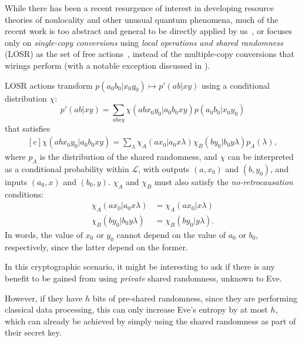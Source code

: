 \documentclass[10pt, a4paper]{article}
\numberwithin{equation}{section} %
\theoremstyle{definition}
\theoremstyle{plain}
\newcommand{\?}{\mathrel{?}} %
\newcommand{\Ls}{\mathcal{L}}
\begin{document}
      While there has been a recent resurgence of interest in developing resource theories of nonlocality and other unusual quantum phenomena, much of the recent work is too abstract and general to be directly applied by us~\cite{Monotones, TypeIndepLOSR}, or focuses only on \emph{single-copy conversions} using \emph{local operations and shared randomness} (LOSR) as the set of free actions~\cite{BellResourceTheory, TraceDistNL, NLMeas}, instead of the multiple-copy conversions that wirings perform (with a notable exception discussed in ).

      LOSR actions transform \(p(a_0 b_0|x_0 y_0) \mapsto p'(ab|xy)\) using a conditional distribution \(\chi\):
      \begin{equation}
        p'(ab|xy) = \sum_{abxy} \chi(abx_0y_0|a_0b_0xy) p(a_0b_0|x_0y_0)
      \end{equation}
      that satisfies
      \begin{equation}
        \begin{aligned}[c]
        \chi(abx_0y_0|a_0b_0xy) = \sum_{\lambda} \chi_A(ax_0|a_0x\lambda) \chi_B(by_0|b_0y\lambda) p_{\Lambda}(\lambda),
        \end{aligned}
      \end{equation}
      where \(p_{\Lambda}\) is the distribution of the shared randomness, and \(\chi\) can be interpreted as a conditional probability within \(\Ls\), with outputs \((a, x_0)\) and \((b, y_0)\), and inputs \((a_0, x)\) and \((b_0, y)\). \(\chi_A\) and \(\chi_B\) must also satisfy the \emph{no-retrocausation} conditions:
      \begin{align}
        \chi_A(ax_0|a_0x\lambda) &= \chi_A(ax_0|x\lambda) \\
        \chi_B(by_0|b_0y\lambda) &= \chi_B(by_0|y\lambda).
      \end{align}
      In words, the value of \(x_0\) or \(y_0\) cannot depend on the value of \(a_0\) or \(b_0\), respectively, since the latter depend on the former.

      In this cryptographic scenario, it might be interesting to ask if there is any benefit to be gained from using \emph{private} shared randomness, unknown to Eve. 


      However, if they have \(h\) bits of pre-shared randomness, since they are performing classical data processing, this can only increase Eve's entropy by at most \(h\), which can already be achieved by simply using the shared randomness as part of their secret key.
\end{document}
